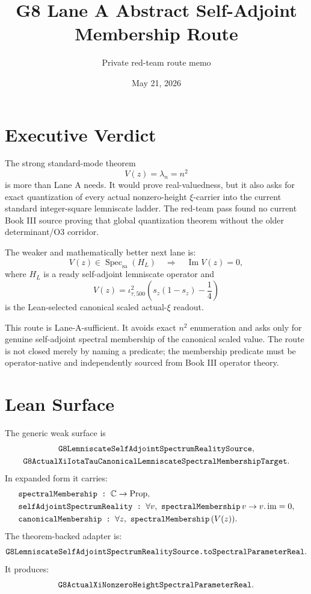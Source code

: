 \documentclass[11pt]{article}
\title{G8 Lane A Abstract Self-Adjoint Membership Route}
\author{Private red-team route memo}
\date{May 21, 2026}
\newcommand{\Spec}{\operatorname{Spec}}
\newcommand{\im}{\operatorname{Im}}
\begin{document}
\maketitle

\section*{Executive Verdict}

The strong standard-mode theorem
\[
  V(z)=\lambda_n=n^2
\]
is more than Lane A needs.  It would prove real-valuedness, but it also asks
for exact quantization of every actual nonzero-height \(\xi\)-carrier into the
current standard integer-square lemniscate ladder.  The red-team pass found no
current Book III source proving that global quantization theorem without the
older determinant/O3 corridor.

The weaker and mathematically better next lane is:
\[
  V(z)\in \Spec_{\mathrm{sa}}(H_L)
  \quad\Longrightarrow\quad
  \im V(z)=0,
\]
where \(H_L\) is a ready self-adjoint lemniscate operator and
\[
  V(z)=\iota_{\tau,500}^2
  \left(s_z(1-s_z)-\frac14\right)
\]
is the Lean-selected canonical scaled actual-\(\xi\) readout.

This route is Lane-A-sufficient.  It avoids exact \(n^2\) enumeration and asks
only for genuine self-adjoint spectral membership of the canonical scaled
value.  The route is not closed merely by naming a predicate; the membership
predicate must be operator-native and independently sourced from Book III
operator theory.

\section*{Lean Surface}

The generic weak surface is
\[
\begin{gathered}
  \verb|G8LemniscateSelfAdjointSpectrumRealitySource|,\\
  \verb|G8ActualXiIotaTauCanonicalLemniscateSpectralMembershipTarget|.
\end{gathered}
\]
In expanded form it carries:
\[
\begin{aligned}
&\verb|spectralMembership : | \mathbb{C}\to\operatorname{Prop},\\
&\verb|selfAdjointSpectrumReality : |
  \forall v,\ \verb|spectralMembership|\,v \to v.\operatorname{im}=0,\\
&\verb|canonicalMembership : |
  \forall z,\ \verb|spectralMembership|\,(V(z)).
\end{aligned}
\]
The theorem-backed adapter is:
\[
  \verb|G8LemniscateSelfAdjointSpectrumRealitySource.toSpectralParameterReal|.
\]
It produces:
\[
  \verb|G8ActualXiNonzeroHeightSpectralParameterReal|.
\]
\end{document}
